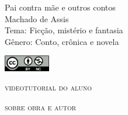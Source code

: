\documentclass{article}
\begin{document}
										\begin{frame}\begin{raggedleft}
										\Huge 
Pai contra mãe e outros contos			\\
										\huge 
Machado de Assis							\\
										\bigskip
										\normalsize
Tema: Ficção, mistério e fantasia		\\	
Gênero: Conto, crônica e novela			\\\vfill\hfill

\publishername

										\end{raggedleft}

\smallskip\includegraphics[width=2cm]{ccbync.png}\hfill
\end{frame}


\begin{frame}{\textsc{videotutorial do aluno}}
\vspace{-2cm}\begin{figure}
\end{figure}
\end{frame}



\begin{frame}
\hfill\Huge
\textsc{sobre obra e autor}
\end{frame}
\end{document}
